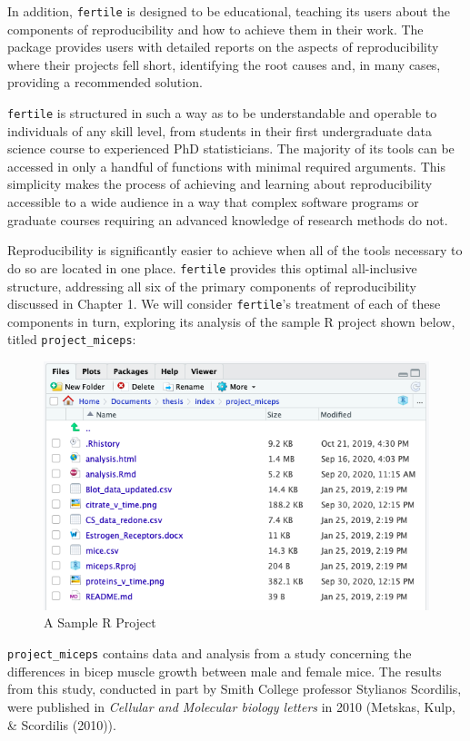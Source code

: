 \documentclass[12pt,twoside]{reedthesis}
\begin{document}
In addition, \texttt{fertile} is designed to be educational, teaching its users about the components of reproducibility and how to achieve them in their work. The package provides users with detailed reports on the aspects of reproducibility where their projects fell short, identifying the root causes and, in many cases, providing a recommended solution.

\texttt{fertile} is structured in such a way as to be understandable and operable to individuals of any skill level, from students in their first undergraduate data science course to experienced PhD statisticians. The majority of its tools can be accessed in only a handful of functions with minimal required arguments. This simplicity makes the process of achieving and learning about reproducibility accessible to a wide audience in a way that complex software programs or graduate courses requiring an advanced knowledge of research methods do not.

Reproducibility is significantly easier to achieve when all of the tools necessary to do so are located in one place. \texttt{fertile} provides this optimal all-inclusive structure, addressing all six of the primary components of reproducibility discussed in Chapter 1. We will consider \texttt{fertile}'s treatment of each of these components in turn, exploring its analysis of the sample R project shown below, titled \texttt{project\_miceps}:
\begin{figure}
\includegraphics[width=1\linewidth]{figure/sample-project} \caption{A Sample R Project}\label{fig:unnamed-chunk-9}
\end{figure}
\texttt{project\_miceps} contains data and analysis from a study concerning the differences in bicep muscle growth between male and female mice. The results from this study, conducted in part by Smith College professor Stylianos Scordilis, were published in \emph{Cellular and Molecular biology letters} in 2010 (Metskas, Kulp, \& Scordilis (2010)).
\end{document}
